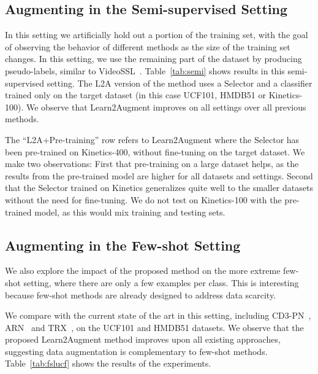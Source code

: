 \documentclass[runningheads]{llncs}
\newcommand{\Method}{Learn2Augment\xspace}
\newcommand{\MethodShort}{L2A\xspace}
\begin{document}
\subsection{Augmenting in the Semi-supervised Setting}

In this setting we artificially hold out a portion of the training set, with the goal of observing the behavior of different methods as the size of the training set changes. In this setting, we use the remaining part of the dataset by producing pseudo-labels, similar to VideoSSL~\cite{Jing_2021_WACV}. Table~\ref{tab:semi} shows results in this semi-supervised setting. The \MethodShort version of the method uses a Selector and a classifier trained only on the target dataset (in this case UCF101, HMDB51 or Kinetics-100). We observe that \Method improves on all settings over all previous methods. 

The ``\MethodShort+Pre-training'' row refers to \Method where the Selector has been pre-trained on Kinetics-400, without fine-tuning on the target dataset. 
We make two observations: First that pre-training on a large dataset helps, as the results from the pre-trained model are higher for all datasets and settings. Second that the Selector trained on Kinetics generalizes quite well to the smaller datasets without the need for fine-tuning. We do not test on Kinetics-100 with the pre-trained model, as this would mix training and testing sets. 


\subsection{Augmenting in the Few-shot Setting}

We also explore the impact of the proposed method on the more extreme few-shot setting, where there are only a few examples per class. This is interesting because few-shot methods are already designed to address data scarcity. 

We compare with the current state of the art in this setting, including CD3-PN~\cite{pn}, ARN~\cite{arn} and TRX~\cite{trx}, on the UCF101 and HMDB51 datasets. We observe that the proposed \Method method improves upon all existing approaches, suggesting data augmentation is complementary to few-shot methods. Table~\ref{tab:fslucf} shows the results of the experiments. 
 
\end{document}
